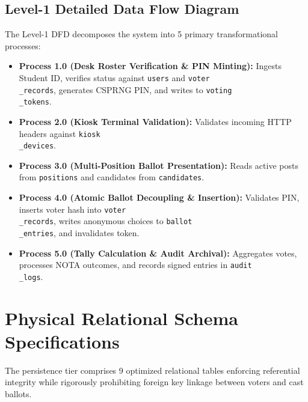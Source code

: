 \documentclass[12pt,a4paper,oneside]{report}
\begin{document}
\subsection{Level-1 Detailed Data Flow Diagram}
The Level-1 DFD decomposes the system into 5 primary transformational processes:
\begin{itemize}
    \item \textbf{Process 1.0 (Desk Roster Verification \& PIN Minting):} Ingests Student ID, verifies status against \texttt{users} and \texttt{voter\\_records}, generates CSPRNG PIN, and writes to \texttt{voting\\_tokens}.
    \item \textbf{Process 2.0 (Kiosk Terminal Validation):} Validates incoming HTTP headers against \texttt{kiosk\\_devices}.
    \item \textbf{Process 3.0 (Multi-Position Ballot Presentation):} Reads active posts from \texttt{positions} and candidates from \texttt{candidates}.
    \item \textbf{Process 4.0 (Atomic Ballot Decoupling \& Insertion):} Validates PIN, inserts voter hash into \texttt{voter\\_records}, writes anonymous choices to \texttt{ballot\\_entries}, and invalidates token.
    \item \textbf{Process 5.0 (Tally Calculation \& Audit Archival):} Aggregates votes, processes NOTA outcomes, and records signed entries in \texttt{audit\\_logs}.
\end{itemize}

\section{Physical Relational Schema Specifications}
The persistence tier comprises 9 optimized relational tables enforcing referential integrity while rigorously prohibiting foreign key linkage between voters and cast ballots.
\end{document}
